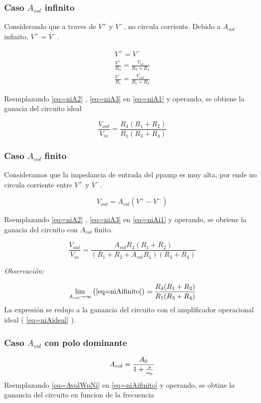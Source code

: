 \documentclass[../../main.tex]{subfiles}
\begin{document}
\subsubsection{Caso $A_{vol}$ infinito}
Considerando que a traves de $V^{+}$ y $V^{-}$, no circula corriente. Debido a  $A_{vol}$ infinito, $V^{+}=V^{-}$.

\begin{gather}
V^{+}=V^{-}\label{eq=niA1} \\
\frac{V^{+}}{R_{4}} =  \frac{V_{in}}{R_{3}+R_{4}}\label{eq=niA2}\\
\frac {V^{-}} {R_{1}}=\frac{V_{out}}{R_{1}+R_{2}}\label{eq=niA3}
\end{gather}

Reemplazando \ref{eq=niA2} , \ref{eq=niA3} en \ref{eq=niA1} y operando, se obtiene la ganacia del circuito ideal

\begin{equation}
\frac{V_{out}}{V_{in}}= \frac {R_{4}(R_{1}+R_{2})}{R_{1}(R_{3}+R_{4})} \label{eq=niAideal}
\end{equation}




\subsubsection{Caso $A_{vol}$ finito}
Consideramos que la impedancia de entrada del ppamp es muy alta, por ende no circula corriente entre $V^{+}$ y $V^{-}$.

\begin{equation}
V_{out}=A_{vol}(V^{+}-V^{-})\label{eq=niAi1} 
\end{equation}

Reemplazando \ref{eq=niA2} , \ref{eq=niA3} en \ref{eq=niAi1} y operando, se obriene la ganacia del circuito con $A_{vol}$ finito.

\begin{equation}
 \frac{V_{out}}{V_{in}}=\frac{A_{vol}R_{4}(R_{1}+R_{2})}{(R_{1}+R_{2}+A_{vol}	R_{1})(R_{3}+R_{4})}\label{eq=niAifinito} 
\end{equation}

\textit{Observaci\'on:}

$$ \lim_{A_{vol}\to\infty} \big( \ref{eq=niAifinito} \big) = \frac {R_{4}(R_{1}+R_{2})}{R_{1}(R_{3}+R_{4})} $$
La expresión se redujo a la ganancia del circuito con el amplificador operacional ideal \big( \ref{eq=niAideal} \big).


\subsubsection{Caso $A_{vol}$  con polo dominante}
\begin{equation}
A_{vol }=\frac{A_{0}}{1+\frac{s}{\omega_{p}}}\label{eq=AvolWpNi}\\
\end{equation} 
Reemplazando \ref{eq=AvolWpNi} en \ref{eq=niAifinito}  y operando, se obtine la ganancia del circuito en funcion de la frecuencia
\end{document}
